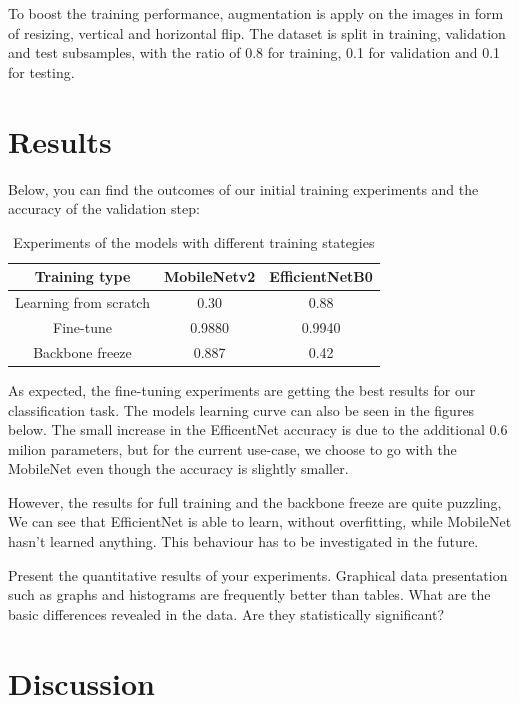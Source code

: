 \documentclass[runningheads,a4paper,11pt]{report}
\begin{document}
To boost the training performance, augmentation is apply on the images in form of resizing, vertical and horizontal flip. The dataset is split in training, validation and test subsamples, with the ratio of 0.8 for training, 0.1 for validation and 0.1 for testing. 



\section{Results}
\label{section:results}

Below, you can find the outcomes of our initial training experiments and the accuracy of the validation step:

\begin{table}[htb]
\centering
\begin{tabular}{|c|c|c|}
\hline
\textbf{Training type} & \textbf{MobileNetv2} & \textbf{EfficientNetB0} \\
\hline
Learning from scratch & 0.30 & 0.88 \\
\hline
Fine-tune & 0.9880 & 0.9940 \\
\hline
Backbone freeze & 0.887 & 0.42 \\
\hline
\end{tabular}
\caption{Experiments of the models with different training stategies}
\label{tab:results_sgd}
\end{table}

As expected, the fine-tuning experiments are getting the best results for our classification task. The models learning curve can also be seen in the figures below. The 
small increase in the EfficentNet accuracy is due to the additional 0.6 milion parameters, but for the current use-case, we choose to go with the MobileNet even though the accuracy is slightly smaller.  

However, the results for full training and the backbone freeze are quite puzzling, We can see that EfficientNet is able to learn, without overfitting, while MobileNet hasn't learned anything. This behaviour has to be investigated in the future.

Present the quantitative results of your experiments. Graphical data presentation such as graphs and histograms are frequently better than tables. What are the basic differences revealed in the data. Are they statistically significant?

\section{Discussion}
\label{section:discussion}
\end{document}
